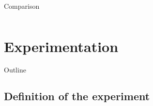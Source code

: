 \documentclass{beamer}
\begin{document}
\begin{frame}{Comparison}
\begin{columns}[c]
\begin{center}
                    \end{center}
    \end{columns}
\end{frame}

\section{Experimentation}

\begin{frame}{Outline}

	\tableofcontents[currentsection]

\end{frame}

\subsection{Definition of the experiment}
\end{document}
